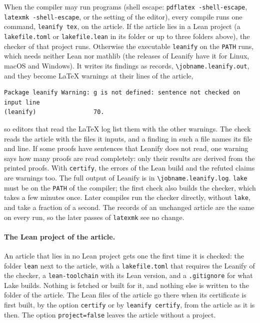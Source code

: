 \documentclass[11pt]{article}
\newcommand*\opt[1]{\texttt{#1}}
\newcommand*\cs[1]{\texttt{\textbackslash#1}}
\begin{document}
When the compiler may run programs (shell escape: \texttt{pdflatex -shell-escape},
\texttt{latexmk -shell-escape}, or the setting of the editor), every compile runs
one command, \texttt{leanify tex}, on the article. If the article lies in a Lean
project (a \texttt{lakefile.toml} or \texttt{lakefile.lean} in its folder or up
to three folders above), the checker of that project runs. Otherwise the
executable \texttt{leanify} on the \texttt{PATH} runs, which needs neither Lean
nor mathlib (the releases of Leanify have it for Linux, macOS and Windows). It
writes its findings as records,
\texttt{\cs{jobname}.leanify.out}, and they become LaTeX
warnings at their lines of the article,
\begin{lstlisting}
Package leanify Warning: g is not defined: sentence not checked on input line
(leanify)                70.
\end{lstlisting}
so editors that read the LaTeX log list them with the other warnings. The
check reads the article with the files it inputs, and a finding in such a file
names its file and line. If some proofs have sentences that Leanify does not
read, one warning says how many proofs are read completely: only their results
are derived from the printed proofs. With
\opt{certify}, the errors of the Lean build and the refuted claims are warnings
too. The full output of Leanify is in \texttt{\cs{jobname}.leanify.log}.
\texttt{lake} must be on the \texttt{PATH} of the compiler; the first check
also builds the checker, which takes a few minutes once. Later compiles run the
checker directly, without \texttt{lake}, and take a fraction of a second. The
records of an unchanged article are the same on every run, so the later passes
of \texttt{latexmk} see no change.

\paragraph{The Lean project of the article.} An article that lies in no Lean
project gets one the first time it is checked: the folder \texttt{lean} next to
the article, with a \texttt{lakefile.toml} that requires the Leanify of the
checker, a \texttt{lean-toolchain} with its Lean version, and a
\texttt{.gitignore} for what Lake builds. Nothing is fetched or built for it,
and nothing else is written to the folder of the article. The Lean files of the
article go there when its certificate is first built, by the option
\opt{certify} or by \texttt{leanify certify}, from the article as it is then.
The option \opt{project=false} leaves the article without a project.
\end{document}
